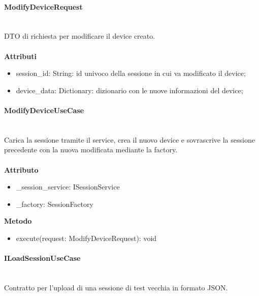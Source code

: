 \documentclass[a4paper,12pt]{article}
\begin{document}
                \paragraph{ModifyDeviceRequest}\mbox{}\\
                    DTO di richiesta per modificare il device creato.\\\\
                    \textbf{Attributi}
                    \begin{itemize}
                        \item {\ttfamily session\_id: String}: id univoco della sessione in cui va modificato il device;
                        \item {\ttfamily device\_data: Dictionary}: dizionario con le nuove informazioni del device;
                    \end{itemize}

                \paragraph{ModifyDeviceUseCase}\mbox{}\\
                    Carica la sessione tramite il service, crea il nuovo device e sovrascrive la sessione precedente con la nuova modificata mediante la factory.\\\\
                    \textbf{Attributo}
                    \begin{itemize}
                        \item {\ttfamily \_session\_service: ISessionService}
                        \item {\ttfamily \_factory: SessionFactory}
                    \end{itemize}
                    \textbf{Metodo}
                    \begin{itemize}
                        \item {\ttfamily execute(request: ModifyDeviceRequest): void}
                    \end{itemize}

                \paragraph{ILoadSessionUseCase}\mbox{}\\
                    Contratto per l'upload di una sessione di test vecchia in formato JSON. 
                    
\end{document}
